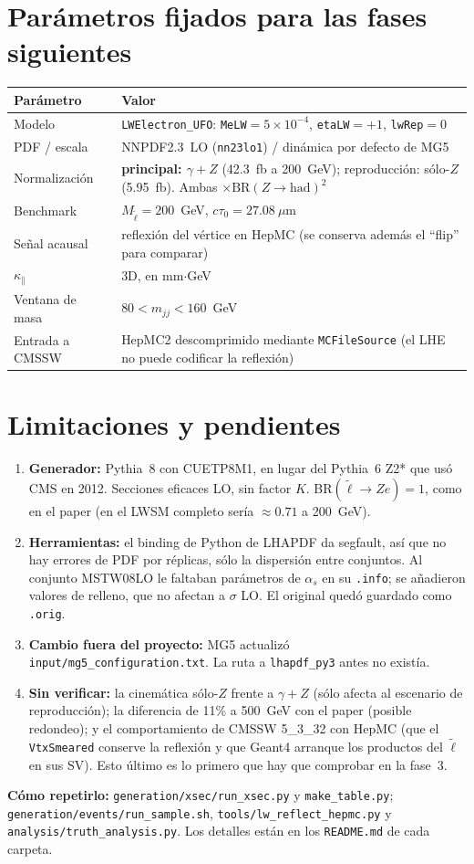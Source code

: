 \documentclass[11pt,a4paper]{article}
\newcommand{\lt}{\tilde{\ell}}
\newcommand{\kpar}{\kappa_{\parallel}}
\begin{document}
\section{Parámetros fijados para las fases siguientes}
\begin{center}\small
\begin{tabular}{l>{\raggedright\arraybackslash}p{12cm}}
\toprule
Parámetro & Valor\\
\midrule
Modelo & \texttt{LWElectron\_UFO}: \texttt{MeLW}$=5\times10^{-4}$, \texttt{etaLW}$=+1$, \texttt{lwRep}$=0$\\
PDF / escala & NNPDF2.3~LO (\texttt{nn23lo1}) / dinámica por defecto de MG5\\
Normalización & \textbf{principal: $\gamma+Z$} (42.3~fb a 200~GeV); reproducción: sólo-$Z$ (5.95~fb). Ambas $\times\mathrm{BR}(Z\to\mathrm{had})^2$\\
Benchmark & $M_{\lt}=200$~GeV, $c\tau_0=27.08~\mu$m\\
Señal acausal & reflexión del vértice en HepMC (se conserva además el ``flip'' para comparar)\\
$\kpar$ & 3D, en mm$\cdot$GeV\\
Ventana de masa & $80<m_{jj}<160$~GeV\\
Entrada a CMSSW & HepMC2 descomprimido mediante \texttt{MCFileSource} (el LHE no puede codificar la reflexión)\\
\bottomrule
\end{tabular}
\end{center}

\section{Limitaciones y pendientes}
\begin{enumerate}
\item \textbf{Generador:} Pythia~8 con CUETP8M1, en lugar del Pythia~6 Z2* que usó CMS en 2012. Secciones eficaces LO, sin factor $K$. BR$(\lt\to Ze)=1$, como en el paper (en el LWSM completo sería $\approx0.71$ a 200~GeV).
\item \textbf{Herramientas:} el binding de Python de LHAPDF da segfault, así que no hay errores de PDF por réplicas, sólo la dispersión entre conjuntos. Al conjunto MSTW08LO le faltaban parámetros de $\alpha_s$ en su \texttt{.info}; se añadieron valores de relleno, que no afectan a $\sigma$ LO. El original quedó guardado como \texttt{.orig}.
\item \textbf{Cambio fuera del proyecto:} MG5 actualizó \texttt{input/mg5\_configuration.txt}. La ruta a \texttt{lhapdf\_py3} antes no existía.
\item \textbf{Sin verificar:} la cinemática sólo-$Z$ frente a $\gamma+Z$ (sólo afecta al escenario de reproducción); la diferencia de 11\% a 500~GeV con el paper (posible redondeo); y el comportamiento de CMSSW 5\_3\_32 con HepMC (que el \texttt{VtxSmeared} conserve la reflexión y que Geant4 arranque los productos del $\lt$ en sus SV). Esto último es lo primero que hay que comprobar en la fase~3.
\end{enumerate}

\vspace{4pt}
\noindent\textbf{Cómo repetirlo:} \texttt{generation/xsec/run\_xsec.py} y \texttt{make\_table.py}; \texttt{generation/events/run\_sample.sh}, \texttt{tools/lw\_reflect\_hepmc.py} y \texttt{analysis/truth\_analysis.py}. Los detalles están en los \texttt{README.md} de cada carpeta.
\end{document}
